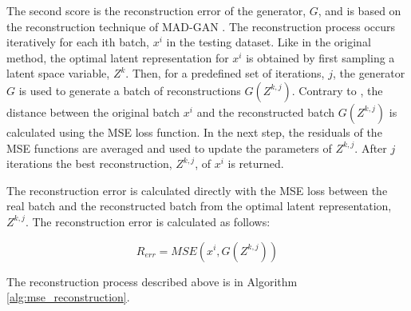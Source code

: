 The second score is the reconstruction error of the generator, $G$, and is based on the reconstruction technique of MAD-GAN \cite{li.etal_MADGANMultivariateAnomaly_2019}. The reconstruction process occurs iteratively for each ith batch, $x^i$ in the testing dataset. Like in the original method, the optimal latent representation for $x^i$ is obtained by first sampling a latent space variable, $Z^k$. Then, for a predefined set of iterations, $j$, the generator $G$ is used to generate a batch of reconstructions $G(Z^{k,j})$. Contrary to \cite{li.etal_MADGANMultivariateAnomaly_2019}, the distance between the original batch $x^i$ and the reconstructed batch $G(Z^{k,j})$ is calculated using the MSE loss function. In the next step, the residuals of the MSE functions are averaged and used to update the parameters of $Z^{k,j}$. After $j$ iterations the best reconstruction, $Z^{k,j}$, of $x^i$ is returned.

The reconstruction error is calculated directly with the MSE loss between the real batch and the reconstructed batch from the optimal latent representation, $Z^{k,j}$. The reconstruction error is calculated as follows:

\begin{equation}
    R_{err} = MSE(x^i, G(Z^{k,j}))
\end{equation}

The reconstruction process described above is in Algorithm \ref{alg:mse_reconstruction}.
\\

\noindent{}

